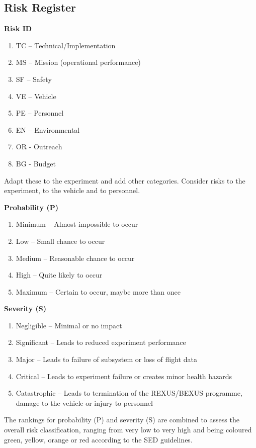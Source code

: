 \documentclass[a4paper,12pt,oneside]{article} %
\begin{document}
\subsection{Risk Register}
\textbf{Risk ID}
\begin{enumerate}[label={}]
    \item TC – Technical/Implementation 
    \item MS – Mission (operational performance) 
    \item SF – Safety 
    \item VE – Vehicle 
    \item PE – Personnel 
    \item EN – Environmental 
    \item OR - Outreach
    \item BG - Budget
\end{enumerate}

Adapt these to the experiment and add other categories. 
Consider risks to the experiment, to the vehicle and to personnel. 

\textbf{Probability (P)}
\begin{enumerate}[label=\Alph*]
    \item Minimum – Almost impossible to occur 
    \item Low – Small chance to occur 
    \item Medium – Reasonable chance to occur 
    \item High – Quite likely to occur 
    \item Maximum – Certain to occur, maybe more than once
\end{enumerate}

\textbf{Severity (S)}
\begin{enumerate}
    \item Negligible – Minimal or no impact 
    \item Significant – Leads to reduced experiment performance 
    \item Major – Leads to failure of subsystem or loss of flight data 
    \item Critical – Leads to experiment failure or creates minor health hazards 
    \item Catastrophic – Leads to termination of the REXUS/BEXUS programme, damage to the vehicle or injury to personnel 
\end{enumerate}

The rankings for probability (P) and severity (S) are combined to assess the overall risk classification, ranging from very low to very high and being coloured green, yellow, orange or red according to the SED guidelines.
\end{document}
